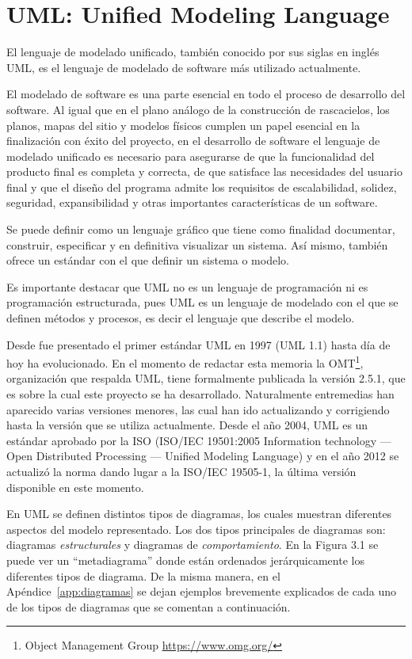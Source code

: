 \documentclass[a4paper, 12pt]{book}
\begin{document}
\section{UML: Unified Modeling Language} 
\label{sec:UML}

El lenguaje de modelado unificado, también conocido por sus siglas en inglés UML, es el lenguaje de modelado de software más utilizado actualmente. 

El modelado de software es una parte esencial en todo el proceso de desarrollo del software. Al igual que en el plano análogo de la construcción de rascacielos, los planos, mapas del sitio y modelos físicos cumplen un papel esencial en la finalización con éxito del proyecto, en el desarrollo de software el lenguaje de modelado unificado es necesario para asegurarse de que la funcionalidad del producto final es completa y correcta, de que satisface las necesidades del usuario final y que el diseño del programa admite los requisitos de escalabilidad, solidez, seguridad, expansibilidad y otras importantes características de un software. 

Se puede definir como un lenguaje gráfico que tiene como finalidad documentar, construir, especificar y en definitiva visualizar un sistema. Así mismo, también ofrece un estándar con el que definir un sistema o modelo. 

Es importante destacar que UML no es un lenguaje de programación ni es programación estructurada, pues UML es un lenguaje de modelado con el que se definen métodos y procesos, es decir el lenguaje que describe el modelo.

Desde fue presentado el primer estándar UML en 1997 (UML 1.1) hasta día de hoy ha evolucionado. En el momento de redactar esta memoria la OMT\footnote{Object Management Group \url{https://www.omg.org/}}, organización que respalda UML, tiene formalmente publicada la versión 2.5.1, que es sobre la cual este proyecto se ha desarrollado.
Naturalmente entremedias han aparecido varias versiones menores, las cual han ido actualizando y corrigiendo hasta la versión que se utiliza actualmente. Desde el año 2004, UML es un estándar aprobado por la ISO (ISO/IEC 19501:2005 Information technology — Open Distributed Processing — Unified Modeling Language) y en el año 2012 se actualizó la norma dando lugar a la ISO/IEC 19505-1, la última versión disponible en este momento.

En UML se definen distintos tipos de diagramas, los cuales muestran diferentes aspectos del modelo representado. 
Los dos tipos principales de diagramas son: diagramas \emph{estructurales} y diagramas de \emph{comportamiento}. En la Figura 3.1 se puede ver un ``metadiagrama'' donde están ordenados jerárquicamente los diferentes tipos de diagrama. De la misma manera, en el Apéndice~\ref{app:diagramas} se dejan ejemplos brevemente explicados de cada uno de los tipos de diagramas que se comentan a continuación.
\end{document}
